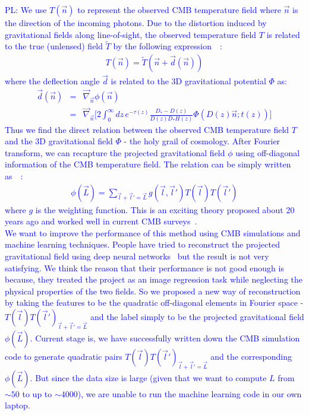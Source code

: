 \documentclass[12pt]{article}
\newcommand{\peikai}[1]{\textcolor{blue}{PL: #1}}
\begin{document}
\begin{small}
\peikai{We use $T(\vec{n})$ to represent the observed CMB temperature field where $\vec{n}$ is the direction of the incoming photons. Due to the distortion induced by gravitational fields along line-of-sight, the observed temperature field $T$ is related to the true (unlensed) field $\tilde{T}$ by the following expression~\cite{Hu:2001tn}~\cite{Li:2019qkp}:
\begin{eqnarray}
T(\vec{n})=\tilde{T}(\vec{n}+\vec{d}(\vec{n}))
\end{eqnarray}
where the deflection angle $\vec{d}$ is related to the 3D gravitational potential $\Phi$ as:
\begin{eqnarray}
\vec{d}(\vec{n})&=& \vec{\nabla}_{\vec{n}} {\phi}(\vec{n})\nonumber \\
&=&\vec{\nabla}_{\vec{n}}\bigg[ 2\int_{0}^{\infty} dz\, e^{-\tau(z)}\frac{D_{*}-D(z)}{D(z)D_{*}H(z)}\Phi(D(z)\vec{n};t(z)) \bigg]
\end{eqnarray}
Thus we find the direct relation between the observed CMB temperature field $T$ and the 3D gravitational field $\Phi$ - the holy grail of cosmology. After Fourier transform, we can recapture the projected gravitational field $\phi$ using off-diagonal information of the CMB temperature field. The relation can be simply written as~\cite{Hu:2001kj}~\cite{Okamoto:2003zw}:
\begin{eqnarray}
\phi(\vec{L}) = \sum_{\vec{l}+\vec{l}'=\vec{L}}g(\vec{l},\vec{l}')  T(\vec{l})T(\vec{l}')
\end{eqnarray}
where $g$ is the weighting function. This is an exciting theory proposed about 20 years ago and worked well in current CMB surveys~\cite{Aghanim:2018oex}. \\
We want to improve the performance of this method using CMB simulations and machine learning techniques. People have tried to reconstruct the projected gravitational field using deep neural networks~\cite{Caldeira:2018ojb} but the result is not very satisfying. We think the reason that their performance is not good enough is because, they treated the project as an image regression task while neglecting the physical properties of the two fields. So we proposed a new way of reconstruction by taking the features to be the quadratic off-diagonal elements in Fourier space - $T(\vec{l})T(\vec{l}')_{\vec{l}+\vec{l}'=\vec{L}}$ and the label simply to be the projected gravitational field $\phi(\vec{L})$. Current stage is, we have successfully written down the CMB simulation code to generate quadratic pairs $T(\vec{l})T(\vec{l}')_{\vec{l}+\vec{l}'=\vec{L}}$ and the corresponding $\phi(\vec{L})$. But since the data size is large (given that we want to compute $L$ from $\sim 50$ to up to $\sim 4000$), we are unable to run the machine learning code in our own laptop.}


\end{small}
\end{document}

